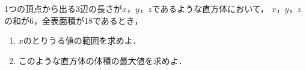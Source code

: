\documentclass[../../main.tex]{subfiles}
\begin{document}
1つの頂点から出る3辺の長さが$x$，$y$，$z$であるような直方体において，
$x$，$y$，$z$の和が6，全表面積が18であるとき，
\begin{enumerate}
  \item $x$のとりうる値の範囲を求めよ．
  \item このような直方体の体積の最大値を求めよ．
\end{enumerate}
\end{document}
